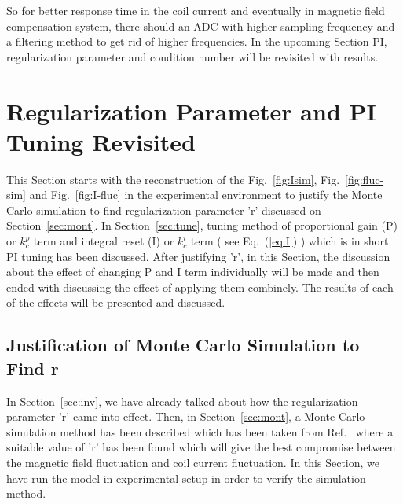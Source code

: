 So for better response time in the coil current and eventually in magnetic field compensation system, there should an ADC with higher sampling frequency and a filtering method to get rid of higher frequencies. In the upcoming Section PI, regularization parameter and condition number will be revisited with results.

\section{Regularization Parameter and PI Tuning Revisited}
This Section starts with the reconstruction of the Fig.~\ref{fig:Isim}, Fig.~\ref{fig:fluc-sim} and Fig.~\ref{fig:I-fluc} in the experimental environment to justify the Monte Carlo simulation to find regularization parameter 'r' discussed on Section~\ref{sec:mont}. In Section~\ref{sec:tune}, tuning method of proportional gain (P) or $k_c^p$ term  and integral reset (I) or $k_c^i$ term (
see Eq.~(\ref{eq:I}) ) which is in short PI tuning has been discussed. After justifying 'r', in this Section, the discussion about the effect of changing P and I term individually will be made and then ended with discussing the effect of applying them combinely. The results of each of the effects will be presented and discussed.


\subsection{Justification of Monte Carlo Simulation to Find r}

In Section~\ref{sec:inv}, we have already talked about how the regularization parameter 'r' came into effect. Then, in Section~\ref{sec:mont}, a Monte Carlo simulation method has been described which has been taken from Ref.~\cite{bea} where a suitable value of 'r' has been found which will give the best compromise between the magnetic field fluctuation and coil current fluctuation. In this Section, we have run the model in experimental setup in order to verify the simulation method.

